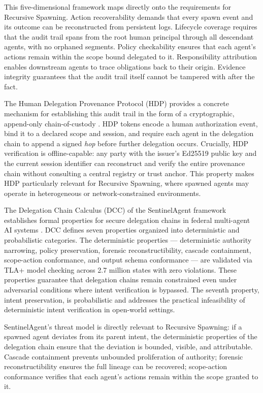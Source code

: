 This five-dimensional framework maps directly onto the requirements for Recursive Spawning. Action recoverability demands that every spawn event and its outcome can be reconstructed from persistent logs. Lifecycle coverage requires that the audit trail spans from the root human principal through all descendant agents, with no orphaned segments. Policy checkability ensures that each agent's actions remain within the scope bound delegated to it. Responsibility attribution enables downstream agents to trace obligations back to their origin. Evidence integrity guarantees that the audit trail itself cannot be tampered with after the fact.

The Human Delegation Provenance Protocol (HDP) provides a concrete mechanism for establishing this audit trail in the form of a cryptographic, append-only chain-of-custody \citep{helixar2025hdp}. HDP tokens encode a human authorization event, bind it to a declared scope and session, and require each agent in the delegation chain to append a signed \emph{hop} before further delegation occurs. Crucially, HDP verification is offline-capable: any party with the issuer's Ed25519 public key and the current session identifier can reconstruct and verify the entire provenance chain without consulting a central registry or trust anchor. This property makes HDP particularly relevant for Recursive Spawning, where spawned agents may operate in heterogeneous or network-constrained environments.

The Delegation Chain Calculus (DCC) of the SentinelAgent framework establishes formal properties for secure delegation chains in federal multi-agent AI systems \citep{sentinelagent2025}. DCC defines seven properties organized into deterministic and probabilistic categories. The deterministic properties — deterministic authority narrowing, policy preservation, forensic reconstructibility, cascade containment, scope-action conformance, and output schema conformance — are validated via TLA+ model checking across 2.7 million states with zero violations. These properties guarantee that delegation chains remain constrained even under adversarial conditions where intent verification is bypassed. The seventh property, intent preservation, is probabilistic and addresses the practical infeasibility of deterministic intent verification in open-world settings.

SentinelAgent's threat model is directly relevant to Recursive Spawning: if a spawned agent deviates from its parent intent, the deterministic properties of the delegation chain ensure that the deviation is bounded, visible, and attributable. Cascade containment prevents unbounded proliferation of authority; forensic reconstructibility ensures the full lineage can be recovered; scope-action conformance verifies that each agent's actions remain within the scope granted to it.

